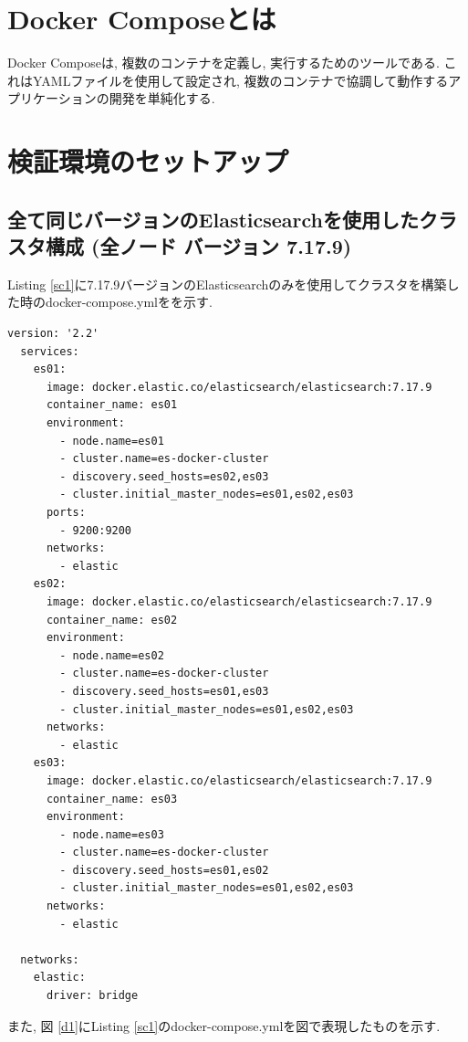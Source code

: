 \section{Docker Composeとは}
Docker Composeは, 複数のコンテナを定義し, 実行するためのツールである. これはYAMLファイルを使用して設定され, 複数のコンテナで協調して動作するアプリケーションの開発を単純化する.

\section{検証環境のセットアップ}
\subsection{全て同じバージョンのElasticsearchを使用したクラスタ構成 (全ノード バージョン 7.17.9)}

Listing \ref{sc1}に7.17.9バージョンのElasticsearchのみを使用してクラスタを構築した時のdocker-compose.ymlをを示す.

\begin{lstlisting}[caption=全て同じバージョンのElasticsearchを使用したクラスタを構成するdocker-compose.yml, label=sc1]
  version: '2.2'
  services:
    es01:
      image: docker.elastic.co/elasticsearch/elasticsearch:7.17.9
      container_name: es01
      environment:
        - node.name=es01
        - cluster.name=es-docker-cluster
        - discovery.seed_hosts=es02,es03
        - cluster.initial_master_nodes=es01,es02,es03
      ports:
        - 9200:9200
      networks:
        - elastic
    es02:
      image: docker.elastic.co/elasticsearch/elasticsearch:7.17.9
      container_name: es02
      environment:
        - node.name=es02
        - cluster.name=es-docker-cluster
        - discovery.seed_hosts=es01,es03
        - cluster.initial_master_nodes=es01,es02,es03
      networks:
        - elastic
    es03:
      image: docker.elastic.co/elasticsearch/elasticsearch:7.17.9
      container_name: es03
      environment:
        - node.name=es03
        - cluster.name=es-docker-cluster
        - discovery.seed_hosts=es01,es02
        - cluster.initial_master_nodes=es01,es02,es03
      networks:
        - elastic
  
  networks:
    elastic:
      driver: bridge
  \end{lstlisting}

また, 図 \ref{d1}にListing \ref{sc1}のdocker-compose.ymlを図で表現したものを示す.


